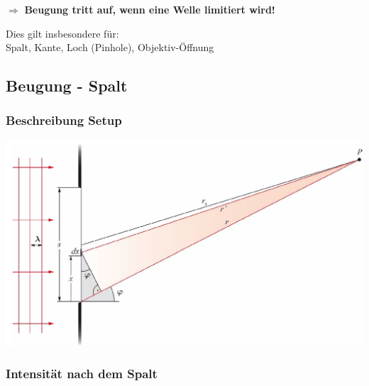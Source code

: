 $\Rightarrow$ \textbf{Beugung tritt auf, wenn eine Welle limitiert wird!} \\
\vspace{0.2cm}

Dies gilt insbesondere für: \\
Spalt, Kante, Loch (Pinhole), Objektiv-Öffnung


\subsection{Beugung - Spalt}

\subsubsection{Beschreibung Setup}\label{Beschreibung Setup}

\includegraphics[width=0.7\linewidth]{Bilder/Wellen-Optik/beugung_spalt} 


\subsubsection{Intensität nach dem Spalt}\label{Spalt-Intensitaet}


